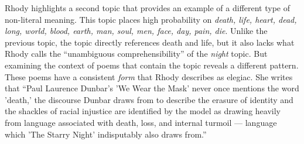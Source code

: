 Rhody highlights a second topic that provides an example of a different type of non-literal meaning.
This topic places high probability on {\em death, life, heart, dead, long, world, blood, earth, man, soul, men, face, day, pain, die}.
Unlike the previous topic, the topic directly references death and life, but it also lacks what Rhody calls the ``unambiguous comprehensibility'' of the {\em night} topic.
But examining the context of poems that contain the topic reveals a different pattern.
These poems have a consistent {\em form} that Rhody describes as elegiac.
She writes that ``Paul Laurence Dunbar's 'We Wear the Mask' never once mentions the word 'death,' the discourse Dunbar draws from to describe the erasure of identity and the shackles of racial injustice are identified by the model as drawing heavily from language associated with death, loss, and internal turmoil --- language which 'The Starry Night' indisputably also draws from.''

